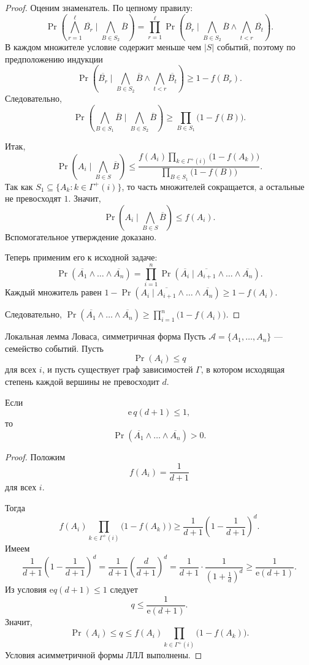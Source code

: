 \begin{proof}
	Оценим знаменатель. По цепному правилу:
	\[
	\Pr\!\left(
	\bigwedge_{r=1}^{\ell}\overline{B_r}
	\mid
	\bigwedge_{B\in S_2}\overline B
	\right)
	=
	\prod_{r=1}^{\ell}
	\Pr\!\left(
	\overline{B_r}
	\mid
	\bigwedge_{B\in S_2}\overline B
	\wedge
	\bigwedge_{t<r}\overline{B_t}
	\right).
	\]
	В каждом множителе условие содержит меньше чем $|S|$ событий, поэтому по предположению
	индукции
	\[
	\Pr\!\left(
	\overline{B_r}
	\mid
	\bigwedge_{B\in S_2}\overline B
	\wedge
	\bigwedge_{t<r}\overline{B_t}
	\right)
	\ge
	1-f(B_r).
	\]
	Следовательно,
	\[
	\Pr\!\left(
	\bigwedge_{B\in S_1}\overline B
	\mid
	\bigwedge_{B\in S_2}\overline B
	\right)
	\ge
	\prod_{B\in S_1}\bigl(1-f(B)\bigr).
	\]
	
	Итак,
	\[
	\Pr\!\left(A_i\mid \bigwedge_{B\in S}\overline B\right)
	\le
	\frac{
		f(A_i)\prod_{k\in \Gamma^+(i)}\bigl(1-f(A_k)\bigr)
	}{
		\prod_{B\in S_1}\bigl(1-f(B)\bigr)
	}.
	\]
	Так как $S_1\subseteq \{A_k:k\in\Gamma^+(i)\}$, то часть множителей сокращается, а остальные
	не превосходят $1$. Значит,
	\[
	\Pr\!\left(A_i\mid \bigwedge_{B\in S}\overline B\right)
	\le f(A_i).
	\]
	Вспомогательное утверждение доказано.
	
	\medskip
	Теперь применим его к исходной задаче:
	\[
	\Pr\!\left(\overline{A_1}\wedge\dots\wedge\overline{A_n}\right)
	=
	\prod_{i=1}^{n}
	\Pr\!\left(
	\overline{A_i}
	\mid
	\overline{A_{i+1}}\wedge\dots\wedge\overline{A_n}
	\right).
	\]
	Каждый множитель равен $1-
	\Pr\!\left(
	A_i
	\mid
	\overline{A_{i+1}}\wedge\dots\wedge\overline{A_n}
	\right)
	\ge 1-f(A_i).$
	
	Следовательно, $\Pr\!\left(\overline{A_1}\wedge\dots\wedge\overline{A_n}\right)
	\ge
	\prod_{i=1}^{n}\bigl(1-f(A_i)\bigr).$
\end{proof}

\begin{Theorem}{Локальная лемма Ловаса, симметричная форма}{}
	Пусть $\mathcal A=\{A_1,\dots,A_n\}$ — семейство событий.
	Пусть
	\[
	\Pr(A_i)\le q
	\]
	для всех $i$, и пусть существует граф зависимостей $\Gamma$, в котором исходящая степень
	каждой вершины не превосходит $d$.
	
	Если
	\[
	\mathrm e\,q(d+1)\le 1,
	\]
	то
	\[
	\Pr\!\left(\overline{A_1}\wedge\dots\wedge\overline{A_n}\right)>0.
	\]
\end{Theorem}

\begin{proof}
	Положим
	\[
	f(A_i)=\frac{1}{d+1}
	\]
	для всех $i$.
	
	Тогда
	\[
	f(A_i)\prod_{k\in\Gamma^+(i)}\bigl(1-f(A_k)\bigr)
	\ge
	\frac{1}{d+1}
	\left(1-\frac{1}{d+1}\right)^d.
	\]
	Имеем
	\[
	\frac{1}{d+1}
	\left(1-\frac{1}{d+1}\right)^d
	=
	\frac{1}{d+1}
	\left(\frac d{d+1}\right)^d
	=
	\frac{1}{d+1}
	\cdot
	\frac{1}{\left(1+\frac1d\right)^d}
	\ge
	\frac{1}{\mathrm e(d+1)}.
	\]
	Из условия $\mathrm e q(d+1)\le 1$ следует
	\[
	q\le \frac{1}{\mathrm e(d+1)}.
	\]
	Значит,
	\[
	\Pr(A_i)\le q
	\le
	f(A_i)\prod_{k\in\Gamma^+(i)}\bigl(1-f(A_k)\bigr).
	\]
	Условия асимметричной формы ЛЛЛ выполнены.
\end{proof}

